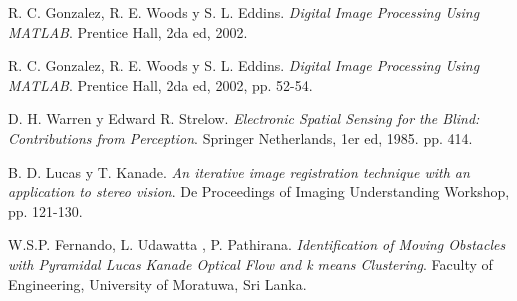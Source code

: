 \begin{thebibliography}{9}

R. C. Gonzalez, R. E. Woods y S. L. Eddins. \textit{Digital Image Processing Using MATLAB}. Prentice Hall, 2da ed, 2002.%

R. C. Gonzalez, R. E. Woods y S. L. Eddins. \textit{Digital Image Processing Using MATLAB}. Prentice Hall, 2da ed, 2002, pp. 52-54.

D. H. Warren y Edward R. Strelow. \textit{Electronic Spatial Sensing for the Blind: Contributions from Perception}. Springer Netherlands, 1er ed, 1985. pp. 414.

B. D. Lucas y T. Kanade. \textit{An iterative image registration technique with an application to stereo vision}. De Proceedings of Imaging Understanding Workshop, pp. 121-130.

W.S.P. Fernando, L. Udawatta , P. Pathirana. \textit{Identification of Moving Obstacles with Pyramidal
Lucas Kanade Optical Flow and k means
Clustering}. Faculty of Engineering, University of Moratuwa, Sri Lanka.

\end{thebibliography}

